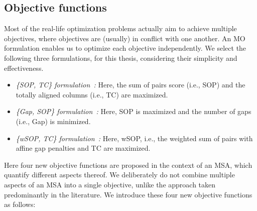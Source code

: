 \subsection{Objective functions}
\label{sec:formulation}
Most of the real-life optimization problems actually aim to achieve multiple objectives, where objectives are (usually) in conflict with one another. An MO formulation enables us to optimize each objective independently. We select the following three formulations, for this thesis, considering their simplicity and effectiveness. \begin{itemize}
	\item \textit{\{SOP, TC\} formulation~\citep{da2010alineaga}:} Here, the sum of pairs score (i.e., SOP) and the totally aligned columns (i.e., TC) are maximized. 

	\item \textit{\{Gap, SOP\} formulation~\citep{abbasi2015local}:} Here, SOP is maximized and the number of gaps (i.e., Gap) is minimized.
	
	\item \textit{\{wSOP, TC\} formulation~\citep{rubio2016hybrid}:} Here, wSOP, i.e., the weighted sum of pairs with affine gap penalties and TC are maximized.
\end{itemize}

Here  four new objective functions are proposed in the context of an MSA, which quantify different aspects thereof. We deliberately do not combine multiple aspects of an MSA into a single objective, unlike the approach taken predominantly in the literature. We introduce these four new objective functions as follows: 

